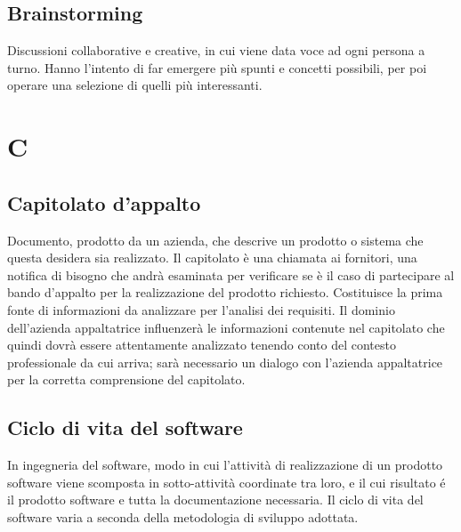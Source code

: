 	\subsection{Brainstorming}
	\label{sec:brainstorming}
	Discussioni collaborative e creative, in cui viene data voce ad ogni persona a turno. Hanno l'intento di far emergere più spunti e concetti possibili, per poi operare una selezione di quelli più interessanti. \newpage
	


	
	\section{C}

	\subsection{Capitolato d'appalto}
	\label{sec:capitolato}
	Documento, prodotto da un azienda, che descrive un prodotto o sistema che questa desidera sia realizzato. Il capitolato è una chiamata ai fornitori, una notifica di bisogno che andrà esaminata per verificare se è il caso di partecipare al bando d'appalto per la realizzazione del prodotto richiesto. Costituisce la prima fonte di informazioni da analizzare per l'analisi dei requisiti. Il dominio dell'azienda appaltatrice influenzerà le informazioni contenute nel capitolato che quindi dovrà essere attentamente analizzato tenendo conto del contesto professionale da cui arriva; sarà necessario un dialogo con l'azienda appaltatrice per la corretta comprensione del capitolato. 
	
	\subsection{Ciclo di vita del software}
	\label{sec:ciclodivita}
	In ingegneria del software, modo in cui l'attività di realizzazione di un prodotto software viene scomposta in sotto-attività coordinate tra loro, e il cui risultato é il prodotto software e tutta la documentazione necessaria. Il ciclo di vita del software varia a seconda della metodologia di sviluppo adottata.

